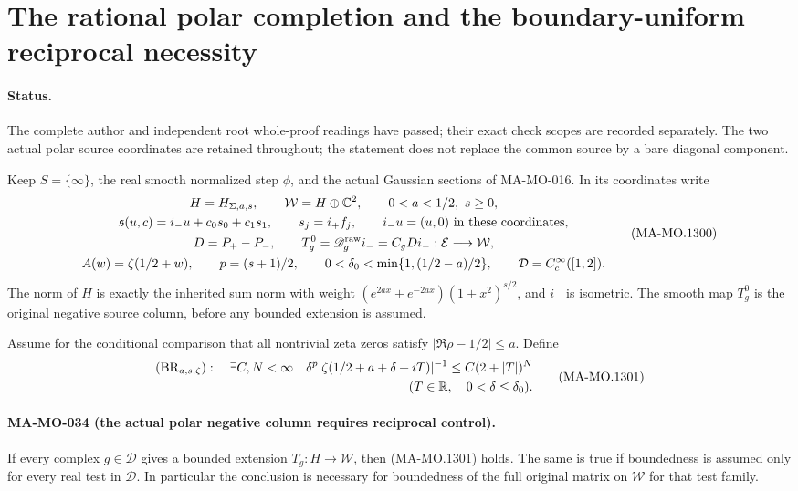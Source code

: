 \section{The rational polar completion and the boundary-uniform reciprocal necessity}
\label{sec:polar-cluster-obstruction}

\paragraph{Status.}
The complete author and independent root whole-proof readings
have passed; their exact check scopes are recorded separately.
The two actual polar source coordinates are retained throughout;
the statement does not replace the common source by a bare
diagonal component.

Keep $S=\{\infty\}$, the real smooth normalized step $\phi$,
and the actual Gaussian sections of MA-MO-016.  In its coordinates
write
\[
\begin{gathered}
 H=H_{\Sigma,a,s},\qquad
 \mathcal W=H\oplus\mathbb C^2,\qquad 0<a<1/2,\ s\ge0,\\
 \mathfrak s(u,c)=i_-u+c_0s_0+c_1s_1,\qquad
 s_j=i_+f_j,\qquad i_-u=(u,0)\text{ in these coordinates},\\
 D=P_+-P_-,\qquad
 T_g^0=\mathscr D_g^{\rm raw}i_-=C_gD i_-:
                                  \mathcal E\longrightarrow\mathcal W,\\
 A(w)=\zeta(1/2+w),\qquad p=(s+1)/2,\qquad
 0<\delta_0<\min\{1,(1/2-a)/2\},\qquad
 \mathcal D=C_c^\infty([1,2]).
\end{gathered}
\tag{MA-MO.1300}
\]
The norm of $H$ is exactly the inherited sum norm with weight
$(e^{2ax}+e^{-2ax})(1+x^2)^{s/2}$, and $i_-$ is isometric.
The smooth map $T_g^0$ is the original negative source column,
before any bounded extension is assumed.

Assume for the conditional comparison that all nontrivial zeta
zeros satisfy $|\Re\rho-1/2|\le a$.  Define
\[
 \begin{gathered}
 (\mathrm{BR}_{a,s,\zeta}):\quad
 \exists C,N<\infty\quad
 \delta^p|\zeta(1/2+a+\delta+iT)|^{-1}
                    \le C(2+|T|)^N\\
 \hfill(T\in\mathbb R,\quad0<\delta\le\delta_0).
 \end{gathered}
 \tag{MA-MO.1301}
\]

\paragraph{MA-MO-034 (the actual polar negative column requires reciprocal control).}
If every complex $g\in\mathcal D$ gives a bounded extension
$T_g:H\to\mathcal W$, then (MA-MO.1301) holds.  The same is
true if boundedness is assumed only for every real test in
$\mathcal D$.  In particular the conclusion is necessary for
boundedness of the full original matrix on $\mathcal W$ for
that test family.

